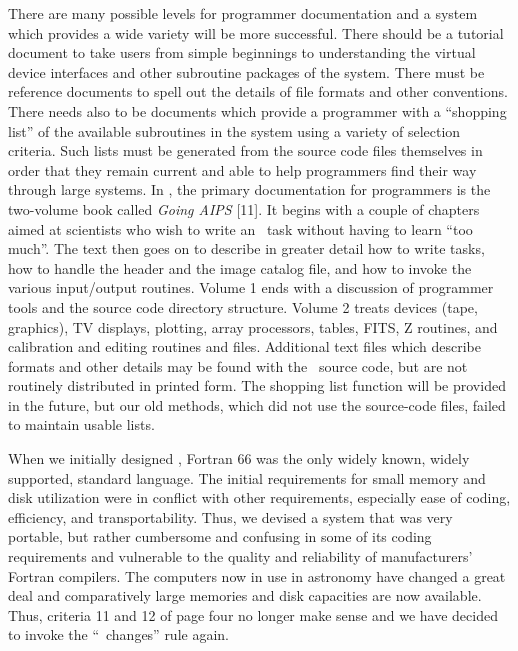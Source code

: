      There are many possible levels for programmer documentation and
a system which provides a wide variety will be more successful.  There
should be a tutorial document to take users from simple beginnings to
understanding the virtual device interfaces and other subroutine
packages of the system.  There must be reference documents to spell
out the details of file formats and other conventions.  There needs
also to be documents which provide a programmer with a ``shopping
list'' of the available subroutines in the system using a variety
of selection criteria.  Such lists must be generated from the source
code files themselves in order that they remain current and able to
help programmers find their way through large systems.  In \AIPS,
the primary documentation for programmers is the two-volume book
called {\it Going AIPS} [11].  It begins with a couple of chapters
aimed at scientists who wish to write an \AIPS\ task without having
to learn ``too much''.  The text then goes on to describe in greater
detail how to write tasks, how to handle the header and the image
catalog file, and how to invoke the various input/output routines.
Volume 1 ends with a discussion of programmer tools and the source
code directory structure.  Volume 2 treats devices (tape, graphics),
TV displays, plotting, array processors, tables, FITS, Z routines,
and calibration and editing routines and files.  Additional text files
which describe formats and other details may be found with the \AIPS\
source code, but are not routinely distributed in printed form.  The
shopping list function will be provided in the future, but our old
methods, which did not use the source-code files, failed to maintain
usable lists.

\vfill\eject%


      When we initially designed \AIPS, Fortran 66 was the only widely
known, widely supported, standard language.  The initial requirements
for small memory and disk utilization were in conflict with other
requirements, especially ease of coding, efficiency, and transportability.
Thus, we devised a system that was very portable, but rather cumbersome
and confusing in some of its coding requirements and vulnerable to the
quality and reliability of manufacturers' Fortran compilers.  The
computers now in use in astronomy have changed a great deal and
comparatively large memories and disk capacities are now available.
Thus, criteria 11 and 12 of page four no longer make sense and we have
decided to invoke the ``\AIPS\ changes'' rule again.

